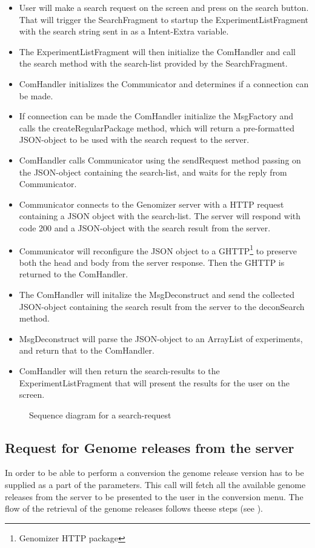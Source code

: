 	\begin{itemize}
		\item
			User will make a search request on the screen and press on the search button. That will trigger the SearchFragment to startup the ExperimentListFragment with the search string sent in as a Intent-Extra variable.
		\item
			The ExperimentListFragment will then initialize the ComHandler and call the search method with the search-list provided by the SearchFragment.
		\item
			ComHandler initializes the Communicator and determines if a connection can be made.
		\item
			If connection can be made the ComHandler initialize the MsgFactory and calls the createRegularPackage method, which will return a pre-formatted JSON-object to be used with the search request to the server.
		\item
			ComHandler calls Communicator using the sendRequest method passing on the JSON-object containing the search-list, and waits for the reply from Communicator.
		\item
			Communicator connects to the Genomizer server with a HTTP request containing a JSON object with the search-list. The server will respond with code 200 and a JSON-object with the search result from the server.
		\item
			Communicator will reconfigure the JSON object to a GHTTP\footnote{Genomizer HTTP package} to preserve both the head and body from the server response. Then the GHTTP is returned to the ComHandler.
		\item
			The ComHandler will initalize the MsgDeconstruct and send the collected JSON-object containing the search result from the server to the deconSearch method.
		\item
			MsgDeconstruct will parse the JSON-object to an ArrayList of experiments, and return that to the ComHandler.
		\item
			ComHandler will then return the search-results to the ExperimentListFragment that will present the results for the user on the screen.
	\end{itemize} 

	\begin{figure}
		\caption{Sequence diagram for a search-request}
		\label{fig:and_searchseq}
	\end{figure}
    \FloatBarrier
\subsection{Request for Genome releases from the server}
	In order to be able to perform a conversion the genome release version has to be supplied as a part of the parameters. This call will fetch all the available genome releases from the server to be presented to the user in the conversion menu. The flow of the retrieval of the genome releases follows theese steps (see ).
    
